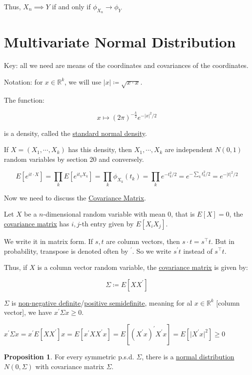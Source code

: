 \documentclass{article}
\theoremstyle{definition}
\newtheorem{proposition}{Proposition}
\begin{document}
Thus, \(X_n \implies Y\) if and only if \(\phi_{X_n}\to \phi_Y\) 

\section*{Multivariate Normal Distribution}

Key: all we need are means of the coordinates and covariances of the coordinates.

Notation: for \(x\in\mathbb{R} ^k\), we will use \(\vert x \vert \coloneqq \sqrt{x\cdot x} \).

The function:

\[
    \boxed{x \mapsto (2\pi)^{-\frac{k}{2}}e^{-\vert x \vert^2 / 2}}
\]

is a density, called the \underline{standard normal density}.

If \(X = (X_1, \cdots, X_k)\) has this density, then \(X_1, \cdots, X_k\) are independent \(N(0,1)\) random variables by section 20 and conversely.

\[
    E[e^{it\cdot X}]=\prod_k E[e^{i t_k X_k}] = \prod_k \phi_{X_k}(t_k)=\prod_k e^{-t_k^2 / 2} = e^{-\sum_k t_k^2 / 2} = \boxed{ e^{- \vert t \vert ^2 / 2} }
\]

Now we need to discuss the \underline{Covariance Matrix}.

Let \(X\) be a \(n\)-dimensional random variable with mean 0, that is \(E[X] = 0\), the \underline{covariance matrix} has \(i,j\)-th entry given by \(E[X_i X_j]\).

We write it in matrix form. If \(s,t\) are column vectors, then \(s\cdot t = s ^{\top} t\). But in probability, transpose is denoted often by \(^{\prime} \). So we write \(s^{\prime} t\) instead of \(s ^{\top} t\).

Thus, if \(X\) is a column vector random variable, the \underline{covariance matrix} is given by:

\[
    \boxed{ \Sigma \coloneqq  E[X X^{\prime}] }
\]

\(\Sigma\) is \underline{non-negative definite}/\underline{positive semidefinite}, meaning for al \(x\in\mathbb{R}^k\) [column vector], we have \(x^{\prime} \Sigma x \geq 0\).

\(x^{\prime} \Sigma x = x^{\prime} E[X X^{\prime}]x=E[x^{\prime} X X^{\prime} x] = E[(X^{\prime} x)^{\prime} X^{\prime} x]=E[\vert X^{\prime} x \vert^2] \geq 0\) 

\begin{proposition}
    For every symmetric p.s.d. \(\Sigma \), there is a \underline{normal distribution} \(N(0,\Sigma)\) with covariance matrix \(\Sigma\).
\end{proposition}
\end{document}
